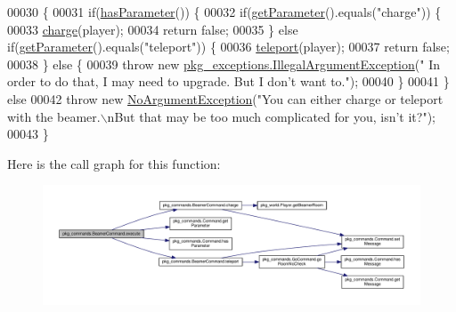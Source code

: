 \begin{DoxyCode}
00030                                                                                                            
                              \{
00031         \textcolor{keywordflow}{if}(\hyperlink{classpkg__commands_1_1Command_a02af95ab3f1898a66259ab7c177b6998}{hasParameter}()) \{
00032             \textcolor{keywordflow}{if}(\hyperlink{classpkg__commands_1_1Command_a41c92d445be73ea9d62320c65efb8434}{getParameter}().equals(\textcolor{stringliteral}{"charge"})) \{
00033                 \hyperlink{classpkg__commands_1_1BeamerCommand_ae71665296a18d581ad1f714c1078e37b}{charge}(player);
00034                 \textcolor{keywordflow}{return} \textcolor{keyword}{false};
00035             \} \textcolor{keywordflow}{else} \textcolor{keywordflow}{if}(\hyperlink{classpkg__commands_1_1Command_a41c92d445be73ea9d62320c65efb8434}{getParameter}().equals(\textcolor{stringliteral}{"teleport"})) \{
00036                 \hyperlink{classpkg__commands_1_1BeamerCommand_a2b6c04242d443d4ff36f255b06ce14be}{teleport}(player);
00037                 \textcolor{keywordflow}{return} \textcolor{keyword}{false};
00038             \} \textcolor{keywordflow}{else} \{
00039                 \textcolor{keywordflow}{throw} \textcolor{keyword}{new} \hyperlink{classpkg__exceptions_1_1IllegalArgumentException}{pkg\_exceptions.IllegalArgumentException}(\textcolor{stringliteral}{"
      In order to do that, I may need to upgrade. But I don't want to."});
00040             \}
00041         \} \textcolor{keywordflow}{else} 
00042             \textcolor{keywordflow}{throw} \textcolor{keyword}{new} \hyperlink{classpkg__exceptions_1_1NoArgumentException}{NoArgumentException}(\textcolor{stringliteral}{"You can either charge or teleport with the
       beamer.\(\backslash\)nBut that may be too much complicated for you, isn't it?"});
00043     \}
\end{DoxyCode}


Here is the call graph for this function\-:
\nopagebreak
\begin{figure}[H]
\begin{center}
\leavevmode
\includegraphics[width=350pt]{classpkg__commands_1_1BeamerCommand_a139dc852e180cabd8af15cfed37dcf0e_cgraph}
\end{center}
\end{figure}


